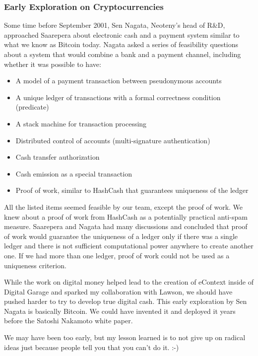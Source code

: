 \subsubsection{Early Exploration on Cryptocurrencies}

Some time before September 2001, Sen Nagata, Neoteny's head of R\&D, approached Saarepera about electronic cash and a payment system similar to what we know as Bitcoin today. Nagata asked a series of feasibility questions about a system that would combine a bank and a payment channel, including whether it was possible to have:
\begin{itemize}
\item A model of a payment transaction between pseudonymous accounts 
\item A unique ledger of transactions with a formal correctness condition (predicate) 
\item A stack machine for transaction processing
\item Distributed control of accounts (multi-signature authentication)
\item Cash transfer authorization
\item Cash emission as a special transaction
\item Proof of work, similar to HashCash that guarantees uniqueness of the ledger
\end{itemize}

All the listed items seemed feasible by our team, except the proof of work. We knew about a proof of work from HashCash \cite{back1997hashcash} as a potentially practical anti-spam measure. Saarepera and Nagata had many discussions and concluded that proof of work would guarantee the uniqueness of a ledger only if there was a single ledger and there is not sufficient computational power anywhere to create another one. If we had more than one ledger, proof of work could not be used as a uniqueness criterion.

While the work on digital money helped lead to the creation of eContext inside of Digital Garage and sparked my collaboration with Lawson, we should have pushed harder to try to develop true digital cash. This early exploration by Sen Nagata is basically Bitcoin. We could have invented it and deployed it years before the Satoshi Nakamoto white paper.

We may have been too early, but my lesson learned is to not give up on radical ideas just because people tell you that you can't do it. :-)

